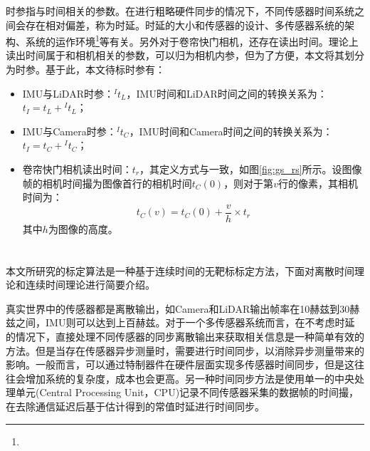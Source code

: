 \begin{enumerate}
        时参指与时间相关的参数。在进行粗略硬件同步的情况下，不同传感器时间系统之间会存在相对偏差，称为时延。时延的大小和传感器的设计、多传感器系统的架构、系统的运作环境\footnote{}等有关。另外对于卷帘快门相机，还存在读出时间。理论上读出时间属于和相机相关的参数，可以归为相机内参，但为了方便，本文将其划分为时参。基于此，本文待标时参有：
        \begin{itemize}
          \item IMU与LiDAR时参：$^{I}t_{L}$，IMU时间和LiDAR时间之间的转换关系为：$t_{I}=t_{L}+{^{I}t_{L}}$；
          \item IMU与Camera时参：$^{I}t_{C}$，IMU时间和Camera时间之间的转换关系为：$t_{I}=t_{C}+{^{I}t_{C}}$；
          \item
                卷帘快门相机读出时间：$t_{r}$，其定义方式与\cite{huai2022observability}一致，如图\ref{fig:gs_rs}所示。设图像帧的相机时间撮为图像首行的相机时间$t_C\left( 0\right)$，则对于第$v$行的像素，其相机时间为：
                \begin{equation}
                  \label{equ:readout_time}
                  t_C(v)=t_C\left( 0\right) +\frac{v}{h} \times t_r
                \end{equation}
                其中$h$为图像的高度。
        \end{itemize}

\end{enumerate}

\section{}
\subsection{}
本文所研究的标定算法是一种基于连续时间的无靶标标定方法，下面对离散时间理论和连续时间理论进行简要介绍。

真实世界中的传感器都是离散输出，如Camera和LiDAR输出帧率在10赫兹到30赫兹之间，IMU则可以达到上百赫兹。对于一个多传感器系统而言，在不考虑时延的情况下，直接处理不同传感器的同步离散输出来获取相关信息是一种简单有效的方法。但是当存在传感器异步测量时，需要进行时间同步，以消除异步测量带来的影响。一般而言，可以通过特制器件在硬件层面实现多传感器时间同步，但是这往往会增加系统的复杂度，成本也会更高。另一种时间同步方法是使用单一的中央处理单元(Central Processing Unit，CPU)记录不同传感器采集的数据帧的时间撮，在去除通信延迟后基于估计得到的常值时延进行时间同步。

